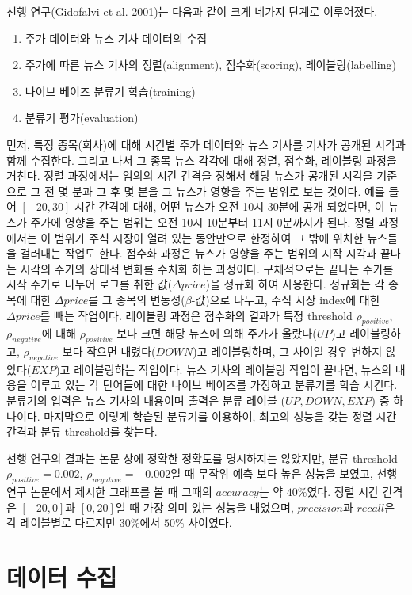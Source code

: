 \documentclass[a4paper,10pt]{article}
\begin{document}
선행 연구(Gidofalvi et al. 2001)는 다음과 같이 크게 네가지 단계로 이루어졌다.
\begin{enumerate}
\item 주가 데이터와 뉴스 기사 데이터의 수집
\item 주가에 따른 뉴스 기사의 정렬(alignment), 점수화(scoring), 레이블링(labelling)
\item 나이브 베이즈 분류기 학습(training)
\item 분류기 평가(evaluation)
\end{enumerate}
먼저, 특정 종목(회사)에 대해 시간별 주가 데이터와 뉴스 기사를 기사가 공개된 시각과 함께 수집한다.
그리고 나서 그 종목 뉴스 각각에 대해 정렬, 점수화, 레이블링 과정을 거친다.
정렬 과정에서는 임의의 시간 간격을 정해서 해당 뉴스가 공개된 시각을 기준으로 그 전 몇 분과 그 후 몇 분을 그 뉴스가 영향을 주는 범위로 보는 것이다.
예를 들어 $[-20, 30]$ 시간 간격에 대해, 어떤 뉴스가 오전 10시 30분에 공개 되었다면, 이 뉴스가 주가에 영향을 주는 범위는 오전 10시 10분부터 11시 0분까지가 된다.
정렬 과정에서는 이 범위가 주식 시장이 열려 있는 동안만으로 한정하여 그 밖에 위치한 뉴스들을 걸러내는 작업도 한다.
점수화 과정은 뉴스가 영향을 주는 범위의 시작 시각과 끝나는 시각의 주가의 상대적 변화를 수치화 하는 과정이다.
구체적으로는 끝나는 주가를 시작 주가로 나누어 로그를 취한 값($\Delta price$)을 정규화 하여 사용한다.
정규화는 각 종목에 대한 $\Delta price$를 그 종목의 변동성($\beta$-값)으로 나누고, 주식 시장 index에 대한 $\Delta price$를 빼는 작업이다.
레이블링 과정은 점수화의 결과가 특정 threshold $\rho_{positive}$, $\rho_{negative}$에 대해
$\rho_{positive}$ 보다 크면 해당 뉴스에 의해 주가가 올랐다($UP$)고 레이블링하고,
$\rho_{negative}$ 보다 작으면 내렸다($DOWN$)고 레이블링하며,
그 사이일 경우 변하지 않았다($EXP$)고 레이블링하는 작업이다.
뉴스 기사의 레이블링 작업이 끝나면, 뉴스의 내용을 이루고 있는 각 단어들에 대한 나이브 베이즈를 가정하고 분류기를 학습 시킨다.
분류기의 입력은 뉴스 기사의 내용이며 출력은 분류 레이블 ($UP, DOWN, EXP$) 중 하나이다.
마지막으로 이렇게 학습된 분류기를 이용하여, 최고의 성능을 갖는 정렬 시간 간격과 분류 threshold를 찾는다.

선행 연구의 결과는 논문 상에 정확한 정확도를 명시하지는 않았지만,
분류 threshold $\rho_{positive}=0.002$, $\rho_{negative}=-0.002$일 때 무작위 예측 보다 높은 성능을 보였고,
선행 연구 논문에서 제시한 그래프를 볼 때 그때의 $accuracy$는 약 $40\%$였다.
정렬 시간 간격은 $[-20,0]$과 $[0,20]$일 때 가장 의미 있는 성능을 내었으며,
$precision$과 $recall$은 각 레이블별로 다르지만 $30\%$에서 $50\%$ 사이였다.

\section{데이터 수집}
\end{document}
